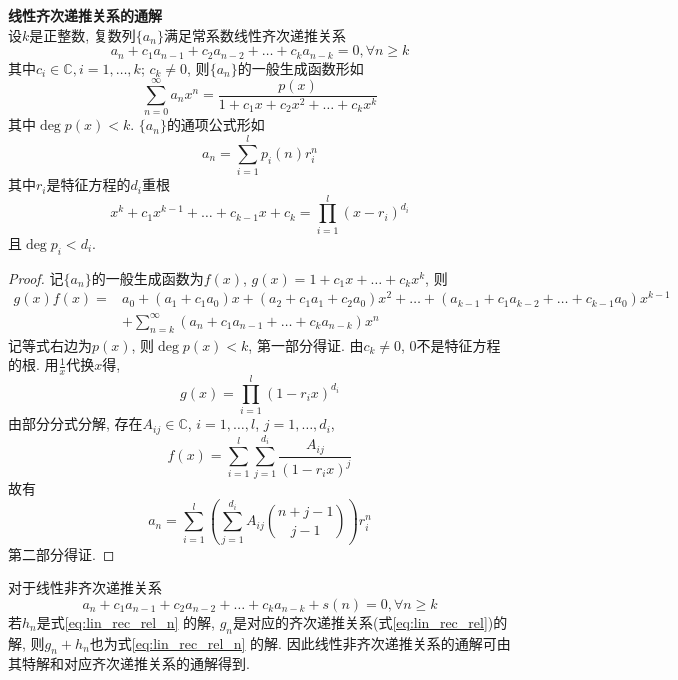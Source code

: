 \begin{thm}\textbf{线性齐次递推关系的通解}\\
设$k$是正整数, 复数列$\{a_n\}$满足常系数线性齐次递推关系
\begin{equation}
    a_n + c_1 a_{n-1} + c_2 a_{n-2} + \dots + c_k a_{n-k}=0, \forall n\ge k
\label{eq:lin_rec_rel}
\end{equation}
其中$c_i\in \mathbb{C}, i=1,\dots,k$; $c_k\neq 0$, 则$\{a_n\}$的一般生成函数形如
\begin{equation}
    \sum_{n=0}^\infty a_nx^n = \frac{p(x)}{1+c_1x+c_2x^2+\dots +c_kx^k}
\end{equation}
其中$\deg p(x) < k$. $\{a_n\}$的通项公式形如
\begin{equation}
    a_n= \sum_{i=1}^l p_i(n) r_i^n
\end{equation}
其中$r_i$是特征方程的$d_i$重根
\begin{equation}
    x^k + c_1 x^{k-1}  + \dots + c_{k-1} x + c_k = \prod_{i=1}^l (x-r_i)^{d_i}
\end{equation}
且$\deg p_i < d_i$. 
\end{thm}

\begin{proof}
记$\{a_n\}$的一般生成函数为$f(x)$, $g(x)=1+c_1x+\dots+c_kx^k$, 则
\begin{align*}
    g(x)f(x) =& a_0 + (a_1+c_1a_0)x + (a_2+c_1a_1+c_2a_0)x^2 +\dots + (a_{k-1}+c_1a_{k-2}+\dots+c_{k-1}a_0)x^{k-1} \\
    &+ \sum_{n=k}^\infty (a_{n}+c_1a_{n-1}+\dots+c_{k}a_{n-k})x^n
\end{align*}
记等式右边为$p(x)$, 则$\deg p(x) < k$, 第一部分得证. 由$c_k\neq 0$, $0$不是特征方程的根. 用$\frac{1}{x}$代换$x$得,
\begin{equation}
    g(x) = \prod_{i=1}^l (1-r_ix)^{d_i}
\end{equation}
由部分分式分解, 存在$A_{ij}\in \mathbb{C}$, $i=1,\dots,l$, $j=1,\dots, d_i$,
\begin{equation}
    f(x) = \sum_{i=1}^l \sum_{j=1}^{d_i} \frac{A_{ij}}{(1-r_ix)^j} 
\end{equation}
故有
\begin{equation}
    a_n = \sum_{i=1}^l \left(\sum_{j=1}^{d_i}A_{ij}\binom{n+j-1}{j-1}\right) r_i^n
\end{equation}
第二部分得证. 
\end{proof}

\par 对于线性非齐次递推关系
\begin{equation}
    a_n + c_1 a_{n-1} + c_2 a_{n-2} + \dots + c_k a_{n-k} + s(n) = 0, \forall n\ge k
\label{eq:lin_rec_rel_n}
\end{equation}
若$h_n$是式\ref{eq:lin_rec_rel_n} 的解, $g_n$是对应的齐次递推关系(式\ref{eq:lin_rec_rel})的解, 则$g_n+h_n$也为式\ref{eq:lin_rec_rel_n} 的解. 因此线性非齐次递推关系的通解可由其特解和对应齐次递推关系的通解得到. 

